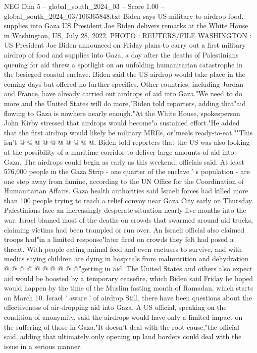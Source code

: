 \begin{textsample}{NEG Dim 5 – global\_south\_2024\_03 – Score 1.00 – global\_south\_2024\_03/106365848.txt}  \label{ex:f5_neg_204}
Biden says US military to airdrop food, supplies into Gaza US President Joe Biden delivers remarks at the White House in Washington, US, July 28, 2022.
PHOTO : REUTERS/FILE WASHINGTON : US President Joe Biden announced on Friday plans to carry out a first military airdrop of food and supplies into Gaza, a day after the deaths of Palestinians queuing for aid threw a spotlight on an unfolding humanitarian catastrophe in the besieged coastal enclave.
Biden said the US airdrop would take place in the coming days but offered no further specifics.
Other countries, including Jordan and France, have already carried out airdrops of aid into Gaza."We need to do more and the United States will do more,"Biden told reporters, adding that"aid flowing to Gaza is nowhere nearly enough."At the White House, spokesperson John Kirby stressed that airdrops would become"a sustained effort."He added that the first airdrop would likely be military MREs, or"meals ready-to-eat.""This isn't @ @ @ @ @ @ @ @ @ @.
Biden told reporters that the US was also looking at the possibility of a maritime corridor to deliver large amounts of aid into Gaza.
The airdrops could begin as early as this weekend, officials said.
At least 576,000 people in the Gaza Strip - one quarter of the enclave ' s population - are one step away from famine, according to the UN Office for the Coordination of Humanitarian Affairs.
Gaza health authorities said Israeli forces had killed more than 100 people trying to reach a relief convoy near Gaza City early on Thursday.
Palestinians face an increasingly desperate situation nearly five months into the war.
Israel blamed most of the deaths on crowds that swarmed around aid trucks, claiming victims had been trampled or run over.
An Israeli official also claimed troops had"in a limited response"later fired on crowds they felt had posed a threat.
With people eating animal feed and even cactuses to survive, and with medics saying children are dying in hospitals from malnutrition and dehydration @ @ @ @ @ @ @ @ @ @"getting in aid.
The United States and others also expect aid would be boosted by a temporary ceasefire, which Biden said Friday he hoped would happen by the time of the Muslim fasting month of Ramadan, which starts on March 10.
Israel ' aware ' of airdrop Still, there have been questions about the effectiveness of air-dropping aid into Gaza.
A US official, speaking on the condition of anonymity, said the airdrops would have only a limited impact on the suffering of those in Gaza."It doesn't deal with the root cause,"the official said, adding that ultimately only opening up land borders could deal with the issue in a serious manner.

\end{textsample}
